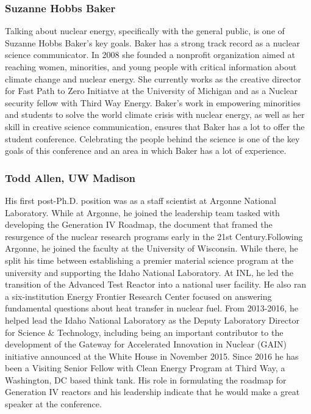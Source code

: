 \subsubsection{Suzanne Hobbs Baker}
Talking about nuclear energy, specifically with the general public, is one of Suzanne Hobbs Baker's key goals. Baker has a strong track record as a nuclear science communicator. In 2008 she founded a nonprofit organization aimed at reaching women, minorities, and young people with critical information about climate change and nuclear energy. She currently works as the creative director for Fast Path to Zero Initiatve at the University of Michigan and as a Nuclear security fellow with Third Way Energy. Baker's work in empowering minorities and students to solve the world climate crisis with nuclear energy, as well as her skill in creative science communication, ensures that Baker has a lot to offer the student conference. Celebrating the people behind the science is one of the key goals of this conference and an area in which Baker has a lot of experience.

\subsubsection{Todd Allen, UW Madison}
His first post-Ph.D. position was as a staff scientist at Argonne National Laboratory. While at Argonne, he joined the leadership team tasked with developing the Generation IV Roadmap, the document that framed the resurgence of the nuclear research programs early in the 21st Century.Following Argonne, he joined the faculty at the University of Wisconsin. While there, he split his time between establishing a premier material science program at the university and supporting the Idaho National Laboratory. At INL, he led the transition of the Advanced Test Reactor into a national user facility. He also ran a six-institution Energy Frontier Research Center focused on answering fundamental questions about heat transfer in nuclear fuel.
From 2013-2016, he helped lead the Idaho National Laboratory as the Deputy Laboratory Director for Science $\&$ Technology, including being an important contributor to the development of the Gateway for Accelerated Innovation in Nuclear (GAIN) initiative announced at the White House in November 2015. Since 2016 he has been a Visiting Senior Fellow with Clean Energy Program at Third Way, a Washington, DC based think tank. His role in formulating the roadmap for Generation IV reactors and his leadership indicate that he would make a great speaker at the conference.

